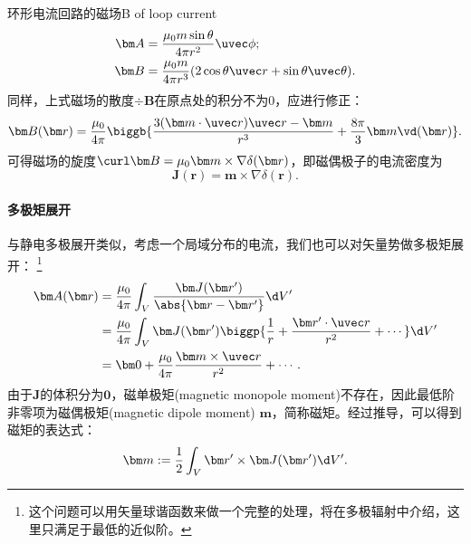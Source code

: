 \begin{example}{环形电流回路的磁场}{B of loop current}
\begin{subequations}
\begin{align}
            \label{eqn:A dipole}
            \bm A&=\frac{\mu_0m\sin\theta}{4\pi r^2}\uvec\phi;\\
            \label{eqn:B dipole }
            \bm B&=\frac{\mu_0m}{4\pi r^3}(2\cos\theta\uvec r+\sin\theta\uvec\theta).
        \end{align}
    \end{subequations}
    同样，上式磁场的散度$\div\bm B$在原点处的积分不为0，应进行修正：
    \begin{equation}
        \label{eqn:B dipole with delta}
        \bm B(\bm r)=\frac{\mu_0}{4\pi}\biggb{\frac{3(\bm m\cdot\uvec r)\uvec r-\bm m}{r^3}+\frac{8\pi}3\bm m\vd(\bm r)}.
    \end{equation}
    可得磁场的旋度$\curl\bm B=\mu_0\bm m\times\nabla\delta(\bm r)$，即磁偶极子的电流密度为
    \begin{equation}
        \bm J(\bm r)=\bm m\times\nabla\delta(\bm r).
    \end{equation}
\end{example}

\paragraph{多极矩展开}

与静电多极展开类似，考虑一个局域分布的电流，我们也可以对矢量势做多极矩展开：
\footnote{这个问题可以用矢量球谐函数来做一个完整的处理，将在多极辐射中介绍，这里只满足于最低的近似阶。}
\begin{align}
    \notag
    \bm A(\bm r)&=\frac{\mu_0}{4\pi}\int_V\frac{\bm J(\bm r')}{\abs{\bm r-\bm r'}}\d V'\\
    \notag
    &=\frac{\mu_0}{4\pi}\int_V\bm J(\bm r')\biggp{\frac1r+\frac{\bm r'\cdot\uvec r}{r^2}+\cdots}\d V'\\
    &=\bm 0+\frac{\mu_0}{4\pi}\frac{\bm m\times\uvec r}{r^2}+\cdots.
\end{align}
由于$\bm J$的体积分为$\bm 0$，磁单极矩(magnetic monopole moment)不存在，因此最低阶非零项为磁偶极矩(magnetic dipole moment) $\bm m$，简称磁矩。经过推导，可以得到磁矩的表达式：
\begin{equation}
    \bm m:=\frac12\int_V\bm r'\times\bm J(\bm r')\d V'.
\end{equation}

